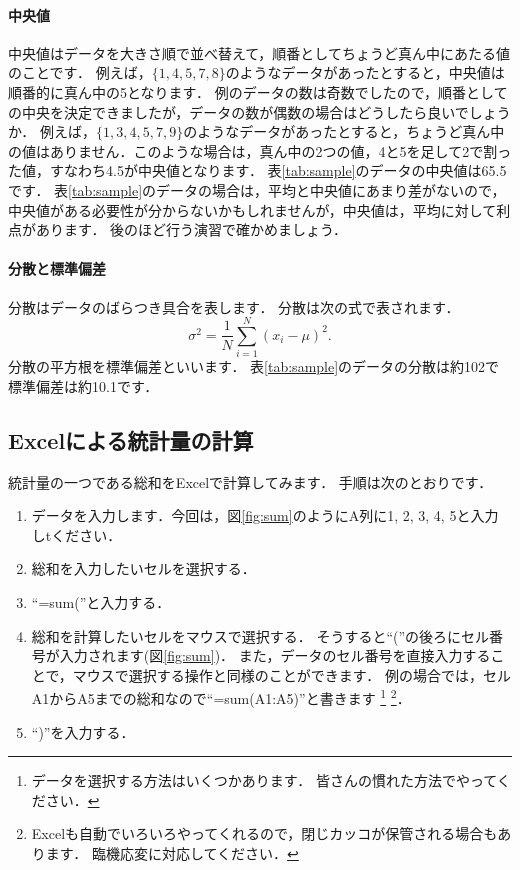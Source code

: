 \paragraph{中央値}
中央値はデータを大きさ順で並べ替えて，順番としてちょうど真ん中にあたる値のことです．
例えば，$\{1, 4, 5, 7, 8\}$のようなデータがあったとすると，中央値は順番的に真ん中の5となります．
例のデータの数は奇数でしたので，順番としての中央を決定できましたが，データの数が偶数の場合はどうしたら良いでしょうか．
例えば，$\{1,3,4,5,7,9\}$のようなデータがあったとすると，ちょうど真ん中の値はありません．このような場合は，真ん中の2つの値，4と5を足して2で割った値，すなわち4.5が中央値となります．
表\ref{tab:sample}のデータの中央値は65.5です．
表\ref{tab:sample}のデータの場合は，平均と中央値にあまり差がないので，中央値がある必要性が分からないかもしれませんが，中央値は，平均に対して利点があります．
後のほど行う演習で確かめましょう．

\paragraph{分散と標準偏差}
分散はデータのばらつき具合を表します．
分散は次の式で表されます．
\begin{equation}
    \sigma^2 = \frac{1}{N} \sum_{i=1}^{N} (x_i - \mu)^2.
\end{equation}
分散の平方根を標準偏差といいます．
表\ref{tab:sample}のデータの分散は約102で標準偏差は約10.1です．


\subsection{Excelによる統計量の計算}

統計量の一つである総和をExcelで計算してみます．
手順は次のとおりです．

\begin{enumerate}
    \item データを入力します．今回は，図\ref{fig:sum}のようにA列に1, 2, 3, 4, 5と入力しtください．
    \item 総和を入力したいセルを選択する．
    \item ``=sum(''と入力する．
    \item 総和を計算したいセルをマウスで選択する．
    そうすると``(''の後ろにセル番号が入力されます(図\ref{fig:sum})．
    また，データのセル番号を直接入力することで，マウスで選択する操作と同様のことができます．
    例の場合では，セルA1からA5までの総和なので``=sum(A1:A5)''と書きます
    \footnote{データを選択する方法はいくつかあります．
      皆さんの慣れた方法でやってください．}
    \footnote{Excelも自動でいろいろやってくれるので，閉じカッコが保管される場合もあります．
      臨機応変に対応してください．}．
    \item ``)''を入力する．
\end{enumerate}

